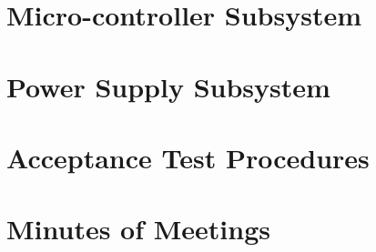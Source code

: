 \documentclass[12pt]{article}
\begin{document}
\section{Micro-controller Subsystem}

\newpage
\section{Power Supply Subsystem}

\newpage
\section{Acceptance Test Procedures}

\newpage
\section{Minutes of Meetings}

\newpage
%
%
\end{document}
